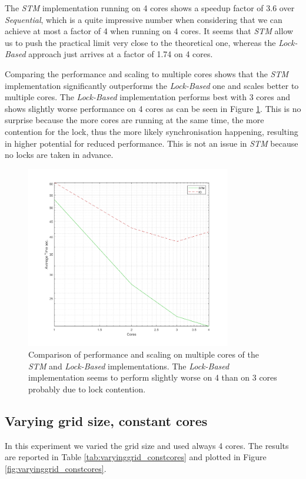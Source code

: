 The \textit{STM} implementation running on 4 cores shows a speedup factor of 3.6 over \textit{Sequential}, which is a quite impressive number when considering that we can achieve at most a factor of 4 when running on 4 cores. It seems that \textit{STM} allow us to push the practical limit very close to the theoretical one, whereas the \textit{Lock-Based} approach just arrives at a factor of 1.74 on 4 cores.

Comparing the performance and scaling to multiple cores shows that the \textit{STM} implementation significantly outperforms the \textit{Lock-Based} one and scales better to multiple cores. The \textit{Lock-Based} implementation performs best with 3 cores and shows slightly worse performance on 4 cores as can be seen in Figure \ref{fig:core_duration_stm_io}. This is no surprise because the more cores are running at the same time, the more contention for the lock, thus the more likely synchronisation happening, resulting in higher potential for reduced performance. This is not an issue in \textit{STM} because no locks are taken in advance. 

\begin{figure}
	\centering
	\includegraphics[width=0.8\textwidth, angle=0]{./fig/concurrentabs/sir/core_duration_stm_io.png}
	\caption{Comparison of performance and scaling on multiple cores of the \textit{STM} and \textit{Lock-Based} implementations. The \textit{Lock-Based} implementation seems to perform slightly worse on 4 than on 3 cores probably due to lock contention.}
	\label{fig:core_duration_stm_io}
\end{figure}

\subsection{Varying grid size, constant cores}
In this experiment we varied the grid size and used always 4 cores. The results are reported in Table \ref{tab:varyinggrid_constcores} and plotted in Figure \ref{fig:varyinggrid_constcores}.

